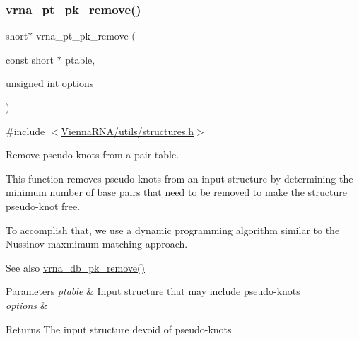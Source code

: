 \subsubsection{\texorpdfstring{vrna\_pt\_pk\_remove()}{vrna\_pt\_pk\_remove()}}
{\footnotesize\ttfamily short$\ast$ vrna\+\_\+pt\+\_\+pk\+\_\+remove (\begin{DoxyParamCaption}\item[{const short $\ast$}]{ptable,  }\item[{unsigned int}]{options }\end{DoxyParamCaption})}



{\ttfamily \#include $<$\mbox{\hyperlink{utils_2structures_8h}{Vienna\+R\+N\+A/utils/structures.\+h}}$>$}



Remove pseudo-\/knots from a pair table. 

This function removes pseudo-\/knots from an input structure by determining the minimum number of base pairs that need to be removed to make the structure pseudo-\/knot free.

To accomplish that, we use a dynamic programming algorithm similar to the Nussinov maxmimum matching approach.

\begin{DoxySeeAlso}{See also}
\mbox{\hyperlink{group__struct__utils__dot__bracket_ga97dbebaa3fc49524cf5afa338a6c52ee}{vrna\+\_\+db\+\_\+pk\+\_\+remove()}}
\end{DoxySeeAlso}

\begin{DoxyParams}{Parameters}
{\em ptable} & Input structure that may include pseudo-\/knots \\
\hline
{\em options} & \\
\hline
\end{DoxyParams}
\begin{DoxyReturn}{Returns}
The input structure devoid of pseudo-\/knots 
\end{DoxyReturn}

